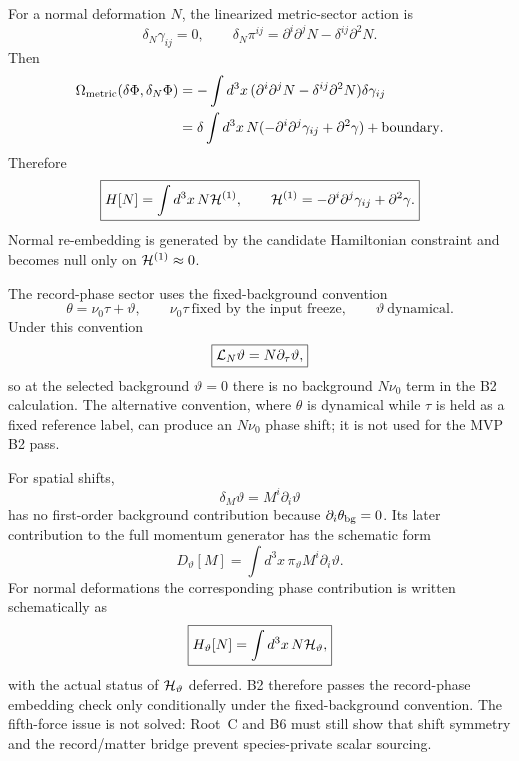 \documentclass[11pt]{article}
\begin{document}
For a normal deformation \(N\), the linearized metric-sector action is
\[
\boxed{
\delta_N\gamma_{ij}=0,\qquad
\delta_N\pi^{ij}=\partial^i\partial^jN-\delta^{ij}\partial^2N.
}
\]
Then
\[
\begin{aligned}
\Omega_{\rm metric}(\delta\Phi,\delta_N\Phi)
&=-\int d^3x\,
(\partial^i\partial^jN-\delta^{ij}\partial^2N)\delta\gamma_{ij}\\
&=\delta\int d^3x\,N
(-\partial^i\partial^j\gamma_{ij}+\partial^2\gamma)
+\text{boundary}.
\end{aligned}
\]
Therefore
\[
\boxed{
H[N]=\int d^3x\,N{\cal H}^{(1)},\qquad
{\cal H}^{(1)}=-\partial^i\partial^j\gamma_{ij}+\partial^2\gamma.
}
\]
Normal re-embedding is generated by the candidate Hamiltonian constraint and
becomes null only on \({\cal H}^{(1)}\approx0\).

The record-phase sector uses the fixed-background convention
\[
\boxed{\theta=\nu_0\tau+\vartheta,\qquad
\nu_0\tau\ \text{fixed by the input freeze},\qquad
\vartheta\ \text{dynamical}.}
\]
Under this convention
\[
\boxed{{\cal L}_N\vartheta=N\partial_\tau\vartheta,}
\]
so at the selected background \(\vartheta=0\) there is no background
\(N\nu_0\) term in the B2 calculation.  The alternative convention, where
\(\theta\) is dynamical while \(\tau\) is held as a fixed reference label,
can produce an \(N\nu_0\) phase shift; it is not used for the MVP B2 pass.

For spatial shifts,
\[
\boxed{\delta_M\vartheta=M^i\partial_i\vartheta}
\]
has no first-order background contribution because
\(\partial_i\theta_{\rm bg}=0\).  Its later contribution to the full momentum
generator has the schematic form
\[
\boxed{
D_\vartheta[M]=\int d^3x\,\pi_\vartheta M^i\partial_i\vartheta.
}
\]
For normal deformations the corresponding phase contribution is written
schematically as
\[
\boxed{H_\vartheta[N]=\int d^3x\,N{\cal H}_\vartheta,}
\]
with the actual status of \({\cal H}_\vartheta\) deferred.  B2 therefore
passes the record-phase embedding check only conditionally under the
fixed-background convention.  The fifth-force issue is not solved: Root~C and
B6 must still show that shift symmetry and the record/matter bridge prevent
species-private scalar sourcing.
\end{document}

